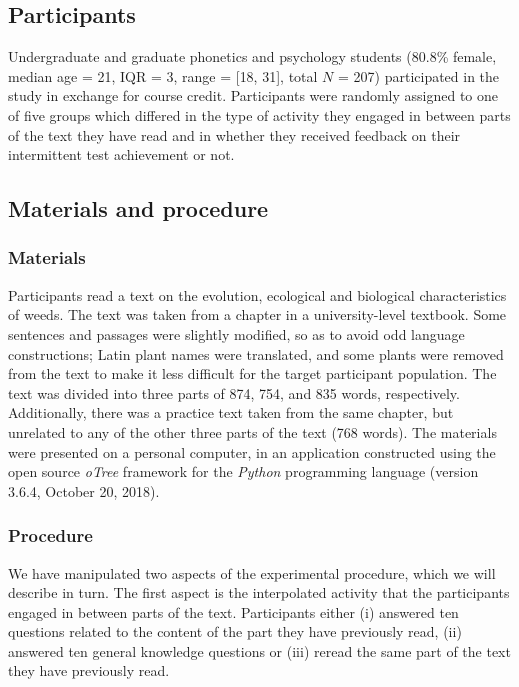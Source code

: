 \documentclass[../main.tex]{subfiles}
\begin{document}
\hypertarget{participants}{%
\subsection{Participants}\label{participants}}

Undergraduate and graduate phonetics and psychology students (80.8\%
female, median age = 21, IQR = 3, range = {[}18, 31{]}, total \(N\) =
207) participated in the study in exchange for course credit.
Participants were randomly assigned to one of five groups which differed
in the type of activity they engaged in between parts of the text they
have read and in whether they received feedback on their intermittent
test achievement or not.

\hypertarget{materials-and-procedure}{%
\subsection{Materials and procedure}\label{materials-and-procedure}}

\hypertarget{materials}{%
\subsubsection{Materials}\label{materials}}

Participants read a text on the evolution, ecological and biological
characteristics of weeds. The text was taken from a chapter in a
university-level textbook. Some sentences and passages were slightly
modified, so as to avoid odd language constructions; Latin plant names
were translated, and some plants were removed from the text to make it
less difficult for the target participant population. The text was
divided into three parts of 874, 754, and 835 words, respectively.
Additionally, there was a practice text taken from the same chapter, but
unrelated to any of the other three parts of the text (768 words). The
materials were presented on a personal computer, in an application
constructed using the open source \textit{oTree} framework
\citep[version 2.1.35,][]{chenOTreeOpensourcePlatform2016} for the
\textit{Python} programming language (version 3.6.4, October 20, 2018).

\hypertarget{procedure}{%
\subsubsection{Procedure}\label{procedure}}

We have manipulated two aspects of the experimental procedure, which we
will describe in turn. The first aspect is the interpolated activity
that the participants engaged in between parts of the text. Participants
either (i) answered ten questions related to the content of the part
they have previously read, (ii) answered ten general knowledge questions
or (iii) reread the same part of the text they have previously read.
\end{document}
